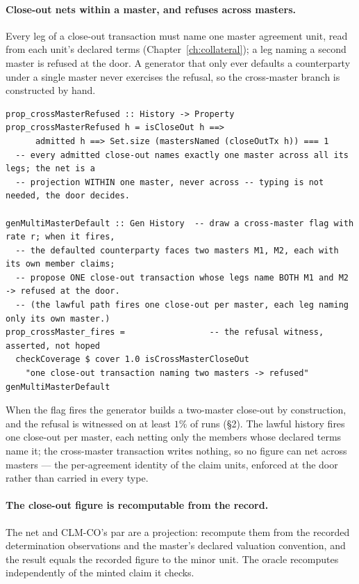 \documentclass[11pt,a4paper]{article}
\begin{document}
\paragraph{Close-out nets within a master, and refuses across masters.} Every leg of a
close-out transaction must name one master agreement unit, read from each unit's declared
terms (Chapter~\ref{ch:collateral}); a leg naming a second master is refused at the door. A
generator that only ever defaults a counterparty under a single master never exercises the
refusal, so the cross-master branch is constructed by hand.

\begin{lstlisting}
prop_crossMasterRefused :: History -> Property
prop_crossMasterRefused h = isCloseOut h ==>
      admitted h ==> Set.size (mastersNamed (closeOutTx h)) === 1
  -- every admitted close-out names exactly one master across all its legs; the net is a
  -- projection WITHIN one master, never across -- typing is not needed, the door decides.

genMultiMasterDefault :: Gen History  -- draw a cross-master flag with rate r; when it fires,
  -- the defaulted counterparty faces two masters M1, M2, each with its own member claims;
  -- propose ONE close-out transaction whose legs name BOTH M1 and M2 -> refused at the door.
  -- (the lawful path fires one close-out per master, each leg naming only its own master.)
prop_crossMaster_fires =                 -- the refusal witness, asserted, not hoped
  checkCoverage $ cover 1.0 isCrossMasterCloseOut
    "one close-out transaction naming two masters -> refused" genMultiMasterDefault
\end{lstlisting}

When the flag fires the generator builds a two-master close-out by construction, and the
refusal is witnessed on at least $1\%$ of runs (\S 2). The lawful history fires one close-out
per master, each netting only the members whose declared terms name it; the cross-master
transaction writes nothing, so no figure can net across masters --- the per-agreement identity
of the claim units, enforced at the door rather than carried in every type.

\paragraph{The close-out figure is recomputable from the record.} The net and CLM-CO's par are
a projection: recompute them from the recorded determination observations and the master's
declared valuation convention, and the result equals the recorded figure to the minor unit.
The oracle recomputes independently of the minted claim it checks.
\end{document}
